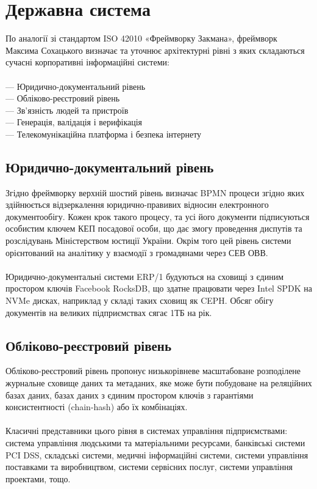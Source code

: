 \chapter{Державна система}

По аналогії зі стандартом ISO 42010 «Фреймворку Закмана»,
фреймворк Максима Сохацького визначає та уточнює архітектурні рівні
з яких складаються сучасні корпоративні інформаційні системи:
\\
\\
--- Юридично-документальний рівень \\
--- Обліково-реєстровий рівень \\
--- Зв'язність людей та пристроїв \\
--- Генерація, валідація і верифікація \\
--- Телекомунікаційна платформа і безпека інтернету\\

\section{Юридично-документальний рівень}

Згідно фреймворку верхній шостий рівень визначає BPMN процеси згідно яких здійнюється
відзеркалення юридично-правивих відносин електронного документообігу. Кожен крок такого
процесу, та усі його документи підписуються особистим ключем КЕП посадової особи, що дає
змогу проведення диспутів та розслідувань Міністерством юстиції України. Окрім того цей
рівень системи орієнтований на аналітику у взаємодії з громадянами через СЕВ ОВВ.
\\
\\
Юридично-документальні системи ERP/1 будуються на сховищі з єдиним
простором ключів Facebook RocksDB, що здатне працювати через Intel SPDK на NVMe
дисках, наприклад у складі таких сховищ як CEPH. Обсяг обігу документів на великих
підприємствах сягає 1ТБ на рік.

\newpage
\section{Обліково-реєстровий рівень}

Обліково-реєстровий рівень пропонує низькорівневе масштабоване розподілене
журнальне сховище даних та метаданих, яке може бути побудоване на реляційних
базах даних, базах даних з єдиним простором ключів з гарантіями
консистентності (chain-hash) або їх комбінаціях.
\\
\\
Класичні представники цього рівня в системах управління підприємствами: система
управління людськими та матеріальними ресурсами, банківські системи PCI DSS,
складські системи, медичні інформаційні системи, системи управління поставками
та виробництвом, системи сервісних послуг, системи управління проектами, тощо.

